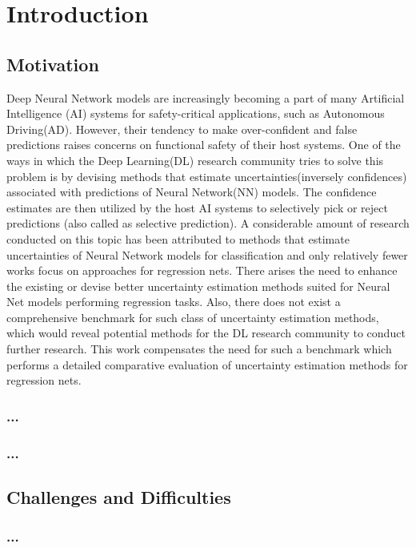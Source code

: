 

    \chapter{Introduction}
    \section{Motivation}
    Deep Neural Network models are increasingly becoming a part of many Artificial Intelligence (AI) systems for safety-critical applications, such as Autonomous Driving(AD). However, their tendency to make over-confident and false predictions raises concerns on functional safety of their host systems. One of the ways in which the Deep Learning(DL) research community tries to solve this problem is by devising methods that estimate uncertainties(inversely confidences) associated with predictions of Neural Network(NN) models. The confidence estimates are then utilized by the host AI systems to selectively pick or reject predictions (also called as selective prediction). A considerable amount of research conducted on this topic has been attributed to methods that estimate uncertainties of Neural Network models for classification and only relatively fewer works focus on approaches for regression nets. There arises the need to enhance the existing or devise better uncertainty estimation methods suited for Neural Net models performing regression tasks. Also, there does not exist a comprehensive benchmark for such class of uncertainty estimation methods, which would reveal potential methods for the DL research community to conduct further research. This work compensates the need for such a benchmark which performs a detailed comparative evaluation of uncertainty estimation methods for regression nets.
    \subsection{...}


    \subsection{...}


    \section{Challenges and Difficulties}
    \subsection{...}

